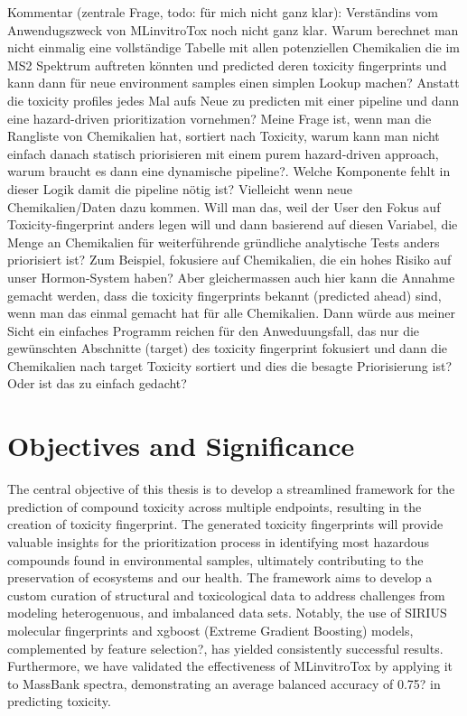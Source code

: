 Kommentar (zentrale Frage, todo: für mich nicht ganz klar): Verständins vom Anwendugszweck von MLinvitroTox noch nicht ganz klar. Warum berechnet man nicht einmalig eine vollständige Tabelle mit allen potenziellen Chemikalien die im MS2 Spektrum auftreten könnten und predicted deren toxicity fingerprints und kann dann für neue environment samples einen simplen Lookup machen? Anstatt die toxicity profiles jedes Mal aufs Neue zu predicten mit einer pipeline und dann eine hazard-driven prioritization vornehmen? Meine Frage ist, wenn man die Rangliste von Chemikalien hat, sortiert nach Toxicity, warum kann man nicht einfach danach statisch priorisieren mit einem purem hazard-driven approach, warum braucht es dann eine dynamische pipeline?. Welche Komponente fehlt in dieser Logik damit die pipeline nötig ist? Vielleicht wenn neue Chemikalien/Daten dazu kommen. Will man das, weil der User den Fokus auf Toxicity-fingerprint anders legen will und dann basierend auf diesen Variabel, die Menge an Chemikalien für weiterführende gründliche analytische Tests anders priorisiert ist? Zum Beispiel, fokusiere auf Chemikalien, die ein hohes Risiko auf unser Hormon-System haben? Aber gleichermassen auch hier kann die Annahme gemacht werden, dass die toxicity fingerprints bekannt (predicted ahead) sind, wenn man das einmal gemacht hat für alle Chemikalien. Dann würde aus meiner Sicht ein einfaches Programm reichen für den Anweduungsfall, das nur die gewünschten Abschnitte (target) des toxicity fingerprint fokusiert und dann die Chemikalien nach target Toxicity sortiert und dies die besagte Priorisierung ist? Oder ist das zu einfach gedacht? 



\section{Objectives and Significance}

The central objective of this thesis is to develop a streamlined framework for the prediction of compound toxicity across multiple endpoints, resulting in the creation of toxicity fingerprint. The generated toxicity fingerprints will provide valuable insights for the prioritization process in identifying most hazardous compounds found in environmental samples, ultimately contributing to the preservation of ecosystems and our health. The framework aims to develop a custom curation of structural and toxicological data to address challenges from modeling heterogenuous, and imbalanced data sets. Notably, the use of SIRIUS molecular fingerprints and xgboost (Extreme Gradient Boosting) models, complemented by feature selection?, has yielded consistently successful results. Furthermore, we have validated the effectiveness of MLinvitroTox by applying it to MassBank spectra, demonstrating an average balanced accuracy of 0.75? in predicting toxicity.

